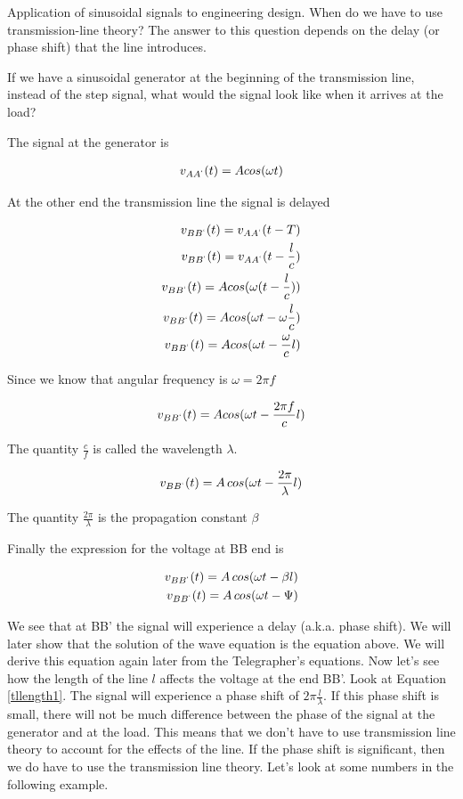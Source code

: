 \documentclass{ximera}
\begin{document}
\begin{example}
Application of sinusoidal signals to engineering design. When do we have to use transmission-line theory? The answer to this question depends on the delay (or phase shift) that the line introduces.

If we have a sinusoidal generator at the beginning of the transmission line, instead of the step signal, what would the signal look like when it arrives at the load?

The signal at the generator is 

\begin{eqnarray}
v_{AA^`}(t)=A cos(\omega t)
\end{eqnarray}

At the other end the transmission line the signal is delayed


\begin{eqnarray}
v_{BB^`}(t)=v_{AA^`}(t-T) \\
v_{BB^`}(t)=v_{AA^`}(t-\frac{l}{c}) \\
v_{BB^`}(t)=A cos(\omega (t - \frac{l}{c}))  \\
v_{BB^`}(t)=A cos(\omega t - \omega \frac{l}{c}) \\
v_{BB^`}(t)=A cos(\omega t -  \frac{\omega }{c} l) 
\end{eqnarray}

Since we know that angular frequency is  $\omega = 2 \pi f$


\begin{eqnarray}
v_{BB^`}(t)=A cos(\omega t -  \frac{ 2 \pi f }{c} l)
\end{eqnarray}

The quantity $\frac{c}{f}$ is called the wavelength $\lambda$. 

\begin{eqnarray}
v_{BB^`}(t)=A \, cos(\omega t -  \frac{ 2 \pi }{\lambda} l) \label{tllength1}
\end{eqnarray}

The quantity $ \frac{ 2 \pi }{\lambda} $ is the propagation constant $\beta$


Finally the expression for the voltage at BB end is


\begin{eqnarray}
v_{BB^`}(t)=A \, cos(\omega t - \beta l) \\
v_{BB^`}(t)=A \, cos(\omega t - \Psi)
\end{eqnarray}

We see that at BB' the signal will experience a delay  (a.k.a. phase shift).
We will later show that the solution of the wave equation is the equation above. We will derive this equation  again later from the Telegrapher's
equations.
Now let's see how the length of the line $l$ affects the voltage at the
end BB'. Look at Equation \ref{tllength1}.
The signal will experience a phase shift of $2\pi \frac{l}{\lambda}$. If this phase shift is small, there will not be much difference between
the phase of the signal at the generator and at the load. This means that we don't have to use transmission line theory to account for the effects of the line.
If the phase shift is significant, then we do have to use the transmission line theory. Let's look at some numbers in the  following example.


\end{example}
\end{document}

